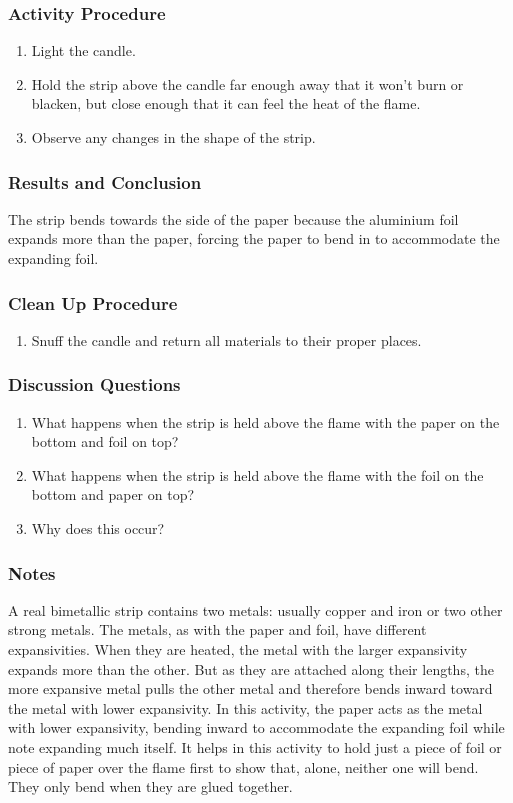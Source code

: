 \subsubsection*{Activity Procedure}
\begin{enumerate}
\item{Light the candle.} 
\item{Hold the strip above the candle far enough away that it won't burn or blacken, but close enough that it can feel the heat of the flame.} 
\item{Observe any changes in the shape of the strip.} 
\end{enumerate}

\subsubsection*{Results and Conclusion}
The strip bends towards the side of the paper because the aluminium foil expands more than the paper, forcing the paper to bend in to accommodate the expanding foil.  

\subsubsection*{Clean Up Procedure}
\begin{enumerate}
\item{Snuff the candle and return all materials to their proper places.} 
\end{enumerate}

\subsubsection*{Discussion Questions}
\begin{enumerate}
\item{What happens when the strip is held above the flame with the paper on the bottom and foil on top?}
\item{What happens when the strip is held above the flame with the foil on the bottom and paper on top?}
\item{Why does this occur?}
\end{enumerate}

\subsubsection*{Notes}
A real bimetallic strip contains two metals: usually copper and iron or two other strong metals. The metals, as with the paper and foil, have different expansivities. When they are heated, the metal with the larger expansivity expands more than the other. But as they are attached along their lengths, the more expansive metal pulls the other metal and therefore bends inward toward the metal with lower expansivity.  
In this activity, the paper acts as the metal with lower expansivity, bending inward to accommodate the expanding foil while note expanding much itself.  
It helps in this activity to hold just a piece of foil or piece of paper over the flame first to show that, alone, neither one will bend. They only bend when they are glued together.  

